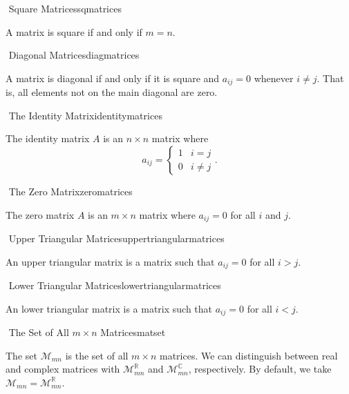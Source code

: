         \begin{definition}{\Stop\,\,Square Matrices}{sqmatrices}
        
            A matrix is square if and only if \(m=n\).
        
        \end{definition}
        \begin{definition}{\Stop\,\,Diagonal Matrices}{diagmatrices}
        
            A matrix is diagonal if and only if it is square and \(a_{ij}=0\) whenever \(i\neq j\). That is, all elements not on the main diagonal are zero.
        
        \end{definition}
        \begin{definition}{\Stop\,\,The Identity Matrix}{identitymatrices}
        
            The identity matrix \(A\) is an \(n\times n\) matrix where
            \begin{equation*}
                a_{ij}=\begin{cases} 1 & i=j \\ 0 & i\neq j \end{cases}.
            \end{equation*}
        
        \end{definition}
        \begin{definition}{\Stop\,\,The Zero Matrix}{zeromatrices}
        
            The zero matrix \(A\) is an \(m\times n\) matrix where \(a_{ij}=0\) for all \(i\) and \(j\).
            
        \end{definition}
        \begin{definition}{\Stop\,\,Upper Triangular Matrices}{uppertriangularmatrices}
        
            An upper triangular matrix is a matrix such that \(a_{ij}=0\) for all \(i>j\).
            
        \end{definition}
        \begin{definition}{\Stop\,\,Lower Triangular Matrices}{lowertriangularmatrices}
        
            An lower triangular matrix is a matrix such that \(a_{ij}=0\) for all \(i<j\).
            
        \end{definition}
        \begin{definition}{\Stop\,\,The Set of All \(m\times n\) Matrices}{matset}
        
            The set \(\mathcal{M}_{mn}\) is the set of all \(m\times n\) matrices. We can distinguish between real and complex matrices with \(\mathcal{M}_{mn}^\mathbb{R}\) and \(\mathcal{M}_{mn}^\mathbb{C}\), respectively. By default, we take \(\mathcal{M}_{mn}=\mathcal{M}_{mn}^\mathbb{R}\). 
            
        \end{definition}
